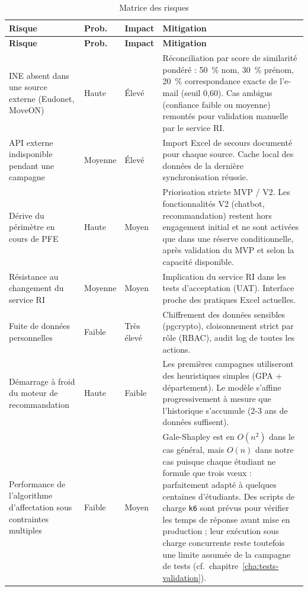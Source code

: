 \renewcommand{\arraystretch}{1.4}
\begin{longtable}{|p{3.9cm}|p{1.4cm}|p{1.4cm}|p{7cm}|}
\caption{Matrice des risques} \\
\hline
\rowcolor{gray!20}
\textbf{Risque} & \textbf{Prob.} & \textbf{Impact} & \textbf{Mitigation} \\
\hline
\endfirsthead
\hline
\rowcolor{gray!20}
\textbf{Risque} & \textbf{Prob.} & \textbf{Impact} & \textbf{Mitigation} \\
\hline
\endhead

INE absent dans une source externe (Eudonet, MoveON) &
Haute & Élevé &
Réconciliation par score de similarité pondéré : 50~\% nom,
30~\% prénom, 20~\% correspondance exacte de l'e-mail (seuil 0,60).
Cas ambigus (confiance faible ou moyenne) remontés pour validation
manuelle par le service RI. \\
\hline

API externe indisponible pendant une campagne &
Moyenne & Élevé &
Import Excel de secours documenté pour chaque source.
Cache local des données de la dernière synchronisation réussie. \\
\hline

Dérive du périmètre en cours de PFE &
Haute & Moyen &
Priorisation stricte MVP / V2. Les fonctionnalités V2
(chatbot, recommandation) restent hors engagement initial et ne sont activées
que dans une réserve conditionnelle, après validation du MVP et selon la capacité disponible. \\
\hline

Résistance au changement du service RI &
Moyenne & Moyen &
Implication du service RI dans les tests d'acceptation (UAT).
Interface proche des pratiques Excel actuelles. \\
\hline

Fuite de données personnelles &
Faible & Très élevé &
Chiffrement des données sensibles (pgcrypto),
cloisonnement strict par rôle (RBAC),
audit log de toutes les actions. \\
\hline

Démarrage à froid du moteur de recommandation &
Haute & Faible &
Les premières campagnes utiliseront des heuristiques simples (GPA + département). Le modèle s'affine progressivement à mesure que l'historique s'accumule (2-3 ans de données suffisent). \\
\hline

Performance de l'algorithme d'affectation sous contraintes multiples &
Faible & Moyen &
Gale-Shapley est en $O(n^2)$ dans le cas général, mais $O(n)$ dans notre cas puisque chaque étudiant ne formule que trois vœux : parfaitement adapté à quelques centaines d'étudiants. Des scripts de charge \texttt{k6} sont prévus pour vérifier les temps de réponse avant mise en production ; leur exécution sous charge concurrente reste toutefois une limite assumée de la campagne de tests (cf.~chapitre~\ref{cha:tests-validation}). \\
\hline

\end{longtable}


